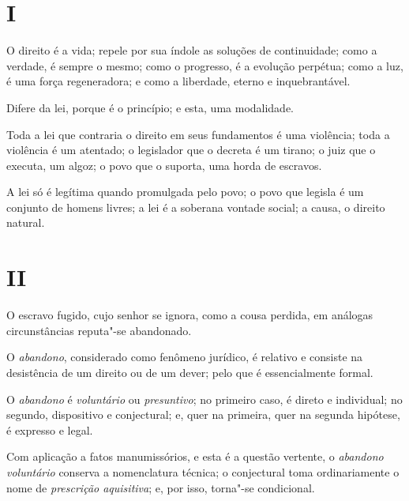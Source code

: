 
\section*{I}


O direito é a vida; repele por sua índole as soluções de continuidade;
como a verdade, é sempre o mesmo; como o progresso, é a evolução
perpétua; como a luz, é uma força regeneradora; e como a liberdade,
eterno e inquebrantável.

Difere da lei, porque é o princípio; e esta, uma modalidade.

Toda a lei que contraria o direito em seus fundamentos é uma violência;
toda a violência é um atentado; o legislador que o decreta é um tirano;
o juiz que o executa, um algoz; o povo que o suporta, uma horda de
escravos.

A lei só é legítima quando promulgada pelo povo; o povo que legisla é um
conjunto de homens livres; a lei é a soberana vontade social; a causa, o
direito natural.

\section*{II}

O escravo fugido, cujo senhor se ignora, como a cousa perdida, em
análogas circunstâncias reputa"-se abandonado.

O \emph{abandono}, considerado como fenômeno jurídico, é relativo e
consiste na desistência de um direito ou de um dever; pelo que é
essencialmente formal.

O \emph{abandono} é \emph{voluntário} ou \emph{presuntivo}; no primeiro
caso, é direto e individual; no segundo, dispositivo e conjectural; e,
quer na primeira, quer na segunda hipótese, é expresso e legal.

Com aplicação a fatos manumissórios, e esta é a questão vertente, o
\emph{abandono voluntário} conserva a nomenclatura técnica; o
conjectural toma ordinariamente o nome de \emph{prescrição aquisitiva};
e, por isso, torna"-se condicional.

